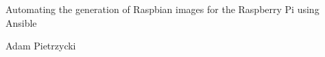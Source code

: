 \documentclass[10pt,a4paper]{report}
\begin{document}
{\huge{Automating the generation of Raspbian images for the Raspberry Pi using Ansible\par}}
\vspace{2mm}
\begin{center}
\large{Adam Pietrzycki\par}
\end{center}
\vspace{2mm}
\end{document}
